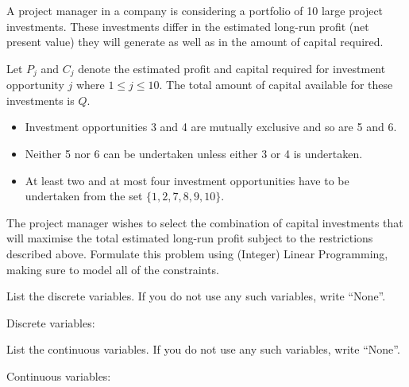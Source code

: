 \documentclass{article}
\begin{document}
\newpage
\begin{Question}
A project manager in a company is considering a portfolio of 10 large project investments.
These investments differ in the estimated long-run profit (net present value) they will generate as well as in the amount of capital required.

Let $P_j$ and $C_j$ denote the estimated profit and capital required for investment opportunity $j$ where $1\leq j\leq 10$.
The total amount of capital available for these investments is $Q$.

\begin{itemize}
    \item Investment opportunities 3 and 4 are mutually exclusive and so are 5 and 6.
    \item Neither 5 nor 6 can be undertaken unless either 3 or 4 is undertaken.
    \item At least two and at most four investment opportunities have to be undertaken from the set $\{1,2,7,8,9,10\}$.
\end{itemize}

The project manager wishes to select the combination of capital investments that will maximise the total estimated long-run profit subject to the restrictions described above.
Formulate this problem using (Integer) Linear Programming, making sure to model all of the constraints.

\begin{Subquestion}
List the discrete variables. If you do not use any such variables, write ``None''.
\begin{makespace}
\vspace{10mm}
\end{makespace}

Discrete variables:
\begin{makespace}
\vspace{10mm}
\end{makespace}
\end{Subquestion}

\begin{Subquestion}
List the continuous variables. If you do not use any such variables, write ``None''.

\begin{makespace}
\vspace{10mm}
\end{makespace}
Continuous variables:
\begin{makespace}
\vspace{10mm}
\end{makespace}
\end{Subquestion}


\end{Question}
\end{document}
